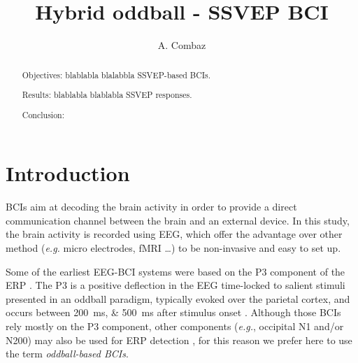 \documentclass[10pt]{article}
\title{Hybrid oddball - SSVEP BCI}
\author[ * ]{A. Combaz}
\affil[ * ]{Computational Neuroscience Group, Laboratory for Neuro- and Psychophysiology, KU Leuven, Leuven, Belgium}
\makeatletter
\newcommand{\extraclearlabels}{\protected@write\@auxout{}{%
  \string\reset@newl@bel
}}
\makeatother
\begin{document}
\maketitle

\begin{abstract}
\extraclearlabels
Objectives:
blablabla blalabbla \ac{SSVEP}-based BCIs.

Results:
blablabla blablabla \ac{SSVEP} responses.

Conclusion:
\end{abstract}


\acresetall

\section{Introduction}
\label{sec:1Intro}

\acp{BCI} aim at decoding the brain activity in order to provide a direct communication channel between the brain and an external device.
In this study, the brain activity is recorded using \ac{EEG}, which offer the advantage over other method (\emph{e.g.} micro electrodes, fMRI \ldots) to be non-invasive and easy to set up.

Some of the earliest \ac{EEG}-\ac{BCI} systems were based on the P3 component of the \ac{ERP} \parencite{Farwell1988, Donchin2000}.
The P3 is a positive deflection in the EEG time-locked to salient stimuli presented in an oddball paradigm, typically evoked over the parietal cortex, and occurs between \SIlist[list-units = single]{200;500}{\ms} after stimulus onset \parencite{Sutton1965}.
Although those \acp{BCI} rely mostly on the P3 component, other components (\emph{e.g.}, occipital N1 and/or N200) may also be used for ERP detection \parencite{Bianchi2010, Kaufmann2011}, for this reason we prefer here to use the term \emph{oddball-based \acp{BCI}}.
\end{document}
